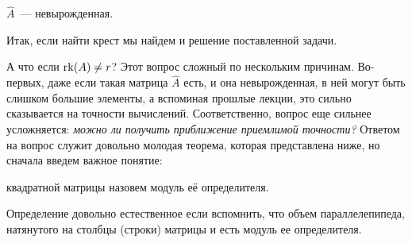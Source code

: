 \begin{remark}
    $\widehat{A}$~--- невырожденная.
\end{remark}

Итак, если найти крест мы найдем и решение поставленной задачи.

А что если $\operatorname{rk}(A)\neq r$? Этот вопрос сложный по нескольким причинам. Во-первых, даже если такая матрица $\widehat{A}$ есть, и она невырожденная,
в ней могут быть слишком большие элементы, а вспоминая прошлые лекции, это сильно сказывается на точности вычислений. Соответственно,
вопрос еще сильнее усложняется: \textit{можно ли получить приближение приемлимой точности?} Ответом на вопрос служит довольно молодая теорема, которая представлена ниже,
но сначала введем важное понятие:

\begin{definition}
     квадратной матрицы назовем модуль её определителя.
\end{definition}

\begin{remark}
    Определение довольно естественное если вспомнить, что
    объем параллелепипеда, натянутого на столбцы (строки) матрицы и есть модуль ее определителя.
\end{remark}

